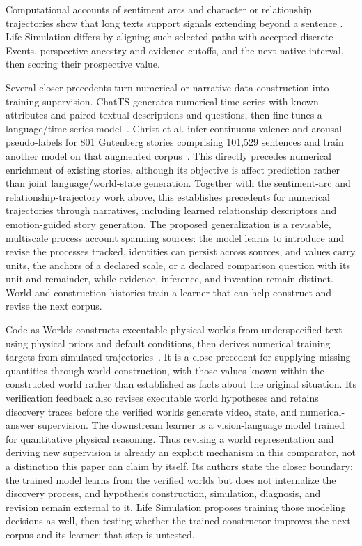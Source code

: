 \documentclass[10pt]{article}
\begin{document}
Computational accounts of sentiment arcs and character or relationship
trajectories show that long texts support signals extending beyond a sentence
\cite{jockers2015syuzhet,reagan2016arcs,iyyer2016relationships,
brahman2020emotion}. Life Simulation differs by aligning such selected paths
with accepted discrete Events, perspective ancestry and evidence cutoffs, and the next native
interval, then scoring their prospective value.

Several closer precedents turn numerical or narrative data construction into
training supervision. ChatTS generates numerical time series with known
attributes and paired textual descriptions and questions, then fine-tunes a
language/time-series model~\cite{xie2025chatts}. Christ et al. infer continuous
valence and arousal pseudo-labels for 801 Gutenberg stories comprising 101,529
sentences and train another model on that augmented
corpus~\cite{christ2024emotionalTrajectories}. This directly precedes numerical
enrichment of existing stories, although its objective is affect prediction
rather than joint language/world-state generation. Together with the
sentiment-arc and relationship-trajectory work above, this establishes
precedents for numerical trajectories through narratives, including learned
relationship descriptors and emotion-guided story generation. The proposed
generalization is a revisable, multiscale process account spanning sources:
the model learns to introduce and revise the processes tracked, identities
can persist across sources, and values carry units, the anchors of a declared
scale, or a declared comparison question with its unit and remainder, while evidence, inference, and invention remain
distinct. World and construction histories train a learner that can help
construct and revise the next corpus.

Code as Worlds constructs
executable physical worlds from underspecified text using physical priors and
default conditions, then derives numerical training targets from simulated
trajectories~\cite{wang2026codeAsWorlds}. It is a close precedent for supplying
missing quantities through world construction, with those values known within
the constructed world rather than established as facts about the original
situation. Its verification feedback also revises executable world hypotheses
and retains discovery traces before the verified worlds generate video, state,
and numerical-answer supervision. The downstream learner is a vision-language
model trained for quantitative physical reasoning. Thus revising a world
representation and deriving new supervision is already an explicit mechanism
in this comparator, not a distinction this paper can claim by itself. Its
authors state the closer boundary: the trained model learns from the verified
worlds but does not internalize the discovery process, and hypothesis
construction, simulation, diagnosis, and revision remain external to it. Life
Simulation proposes training those modeling decisions as well, then testing
whether the trained constructor improves the next corpus and its learner; that
step is untested.
\end{document}
